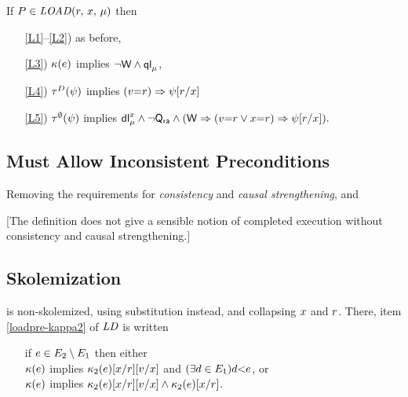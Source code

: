   \noindent
  If $\aPS \in \sLOAD[\amode]{\aReg}{\aLoc}$ then
  \begin{enumerate}
  \item[\ref{L1}--\ref{L2})] as before,
  \item[\ref{L3})] $\kappa(e)$ implies
    \begin{math}
      \lnot\mathsf{W}
      \land \mathsf{ql}_{\mu}^{}
    \end{math},
  \item[\ref{L4})]
    $\aTr{\bEvs}{\bForm}$ implies
    \begin{math}
      (v{=}r)
      \Rightarrow \psi[r/{x}]
    \end{math}
  \item[\ref{L5})] 
    $\aTr{\emptyset}{\bForm}$ implies
    \begin{math}
      \mathsf{dl}_{\mu}^{x}
      \land \lnot\mathsf{Q}_{{\mathsf{ra}}}
      \land
      (\mathsf{W}
      \Rightarrow (v{=}r\lor x{=}r) 
      \Rightarrow \psi[r/{x}]
      ).
    \end{math}
  \end{enumerate}  



\subsection{Must Allow Inconsistent Preconditions}

Removing the requirements for
\emph{consistency} and \emph{causal strengthening}, and

[The definition does not give a sensible notion of completed execution
without consistency and causal strengthening.]

  

\subsection{Skolemization}

\jjr{} is non-skolemized, using substitution instead, and collapsing $x$
and $r$.
There, item \ref{loadpre-kappa2}  of $\sLOADPRE{}{}{}$ is written 
\begin{enumerate}
\item[] %
  if $e\in E_2\setminus E_1$ then either \\
  $\kappa(e)$ implies $\kappa_2(e)[x/r][v/x]$ and $(\exists d\in E_1)d{<}e$, or \\
  $\kappa(e)$ implies
  $\kappa_2(e)[x/r][v/x] \land \kappa_2(e)[x/r]$.
\end{enumerate}


